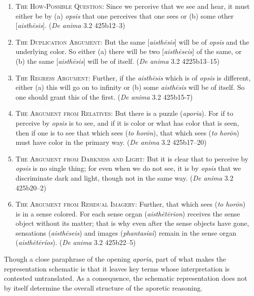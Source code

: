 \begin{enumerate}[(1)]
	\item \textsc{The How-Possible Question}: Since we perceive that we see and hear, it must either be by (a) \emph{opsis} that one perceives that one sees or (b) some other [\emph{aisthēsis}]. (\emph{De anima} 3.2 425b12–3)
	\item \textsc{The Duplication Argument}: But the same [\emph{aisthēsis}] will be of \emph{opsis} and the underlying color. So either (a) there will be two [\emph{aisthēseis}] of the same, or (b) the same [\emph{aisthēsis}] will be of itself. (\emph{De anima} 3.2 4225b13–15)
	\item \textsc{The Regress Argument}: Further, if the \emph{aisthēsis} which is of \emph{opsis} is different, either (a) this will go on to infinity or (b) some \emph{aisthēsis} will be of itself. So one should grant this of the first. (\emph{De anima} 3.2 425b15-7)
	\item \textsc{The Argument from Relatives}: But there is a puzzle (\emph{aporia}). For if to perceive by \emph{opsis} is to see, and if it is color or what has color that is seen, then if one is to see that which sees (\emph{to horōn}), that which sees (\emph{to horōn}) must have color in the primary way. (\emph{De anima} 3.2 425b17–20)
	\item \textsc{The Argument from Darkness and Light}: But it is clear that to perceive by \emph{opsis} is no single thing; for even when we do not see, it is by \emph{opsis} that we discriminate dark and light, though not in the same way. (\emph{De anima} 3.2 425b20–2)
	\item \textsc{The Argument from Residual Imagery}: Further, that which sees (\emph{to horōn}) is in a sense colored. For each sense organ (\emph{aisthētērion}) receives the sense object without its matter; that is why even after the sense objects have gone, sensations (\emph{aisthēseis}) and images (\emph{phantasiai}) remain in the sense organ (\emph{aisthētēríos}). (\emph{De anima} 3.2 425b22–5)
\end{enumerate} 

Though a close paraphrase of the opening \emph{aporia}, part of what makes the representation schematic is that it leaves key terms whose interpretation is contested untranslated. As a consequence, the schematic representation does not by itself determine the overall structure of the aporetic reasoning.

